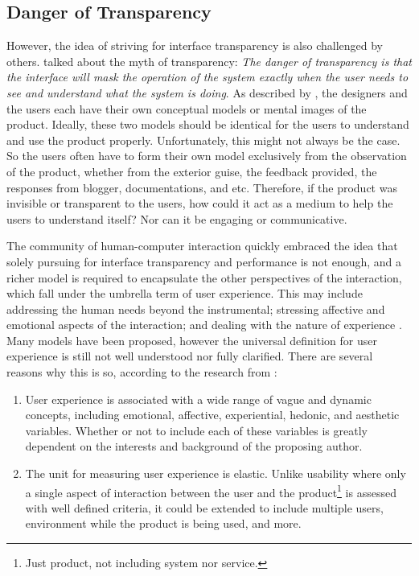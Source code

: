 \documentclass{acm_proc_article-sp}
\begin{document}
\subsection{Danger of Transparency}
However, the idea of striving for interface transparency is also
challenged by others. \citet{windows:bolter} talked about the myth of
transparency: \textit{The danger of transparency is that the interface
  will mask the operation of the system exactly when the user needs to
  see and understand what the system is doing}. As described by
\citet{design:norman}, the designers and the users each have their own
conceptual models or mental images of the product. Ideally, these two
models should be identical for the users to understand and use the
product properly. Unfortunately, this might not always be the case. So
the users often have to form their own model exclusively from the
observation of the product, whether from the exterior guise, the
feedback provided, the responses from blogger, documentations, and
etc. Therefore, if the product was invisible or transparent to the
users, how could it act as a medium to help the users to understand
itself? Nor can it be engaging or communicative.

The community of human-computer interaction quickly embraced the
idea that solely pursuing for interface transparency and performance
is not enough, and a richer model is required to encapsulate the other
perspectives of the interaction, which fall under the umbrella term of
user experience. This may include addressing the human needs beyond
the instrumental; stressing affective and emotional aspects of the
interaction; and dealing with the nature of experience
\citep{ux:hassenzahl}. Many models have been proposed, however the
universal definition for user experience is still not well understood
nor fully clarified. There are several reasons why this is so,
according to the research from \citet{ux:law}:
\begin{enumerate}
  \item User experience is associated with a wide range of vague and
    dynamic concepts, including emotional, affective, experiential,
    hedonic, and aesthetic variables. Whether or not to include each
    of these variables is greatly dependent on the interests and
    background of the proposing author.
  \item The unit for measuring user experience is elastic. Unlike
    usability where only a single aspect of interaction between the
    user and the product\footnote{Just product, not including system
      nor service.} is assessed with well defined criteria, it could
    be extended to include multiple users, environment while the
    product is being used, and more.
\end{enumerate}
\end{document}
